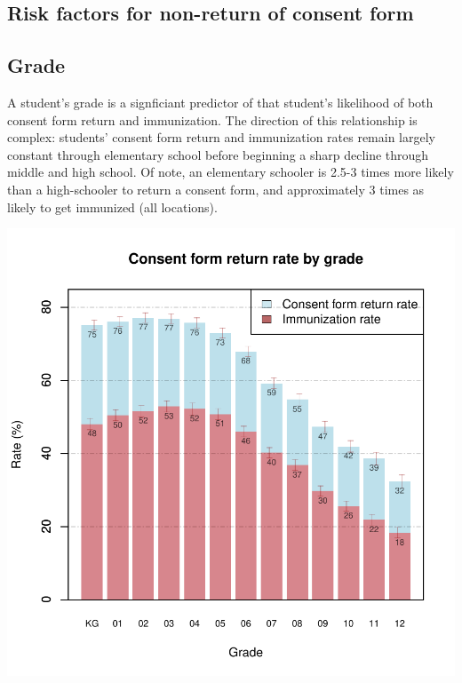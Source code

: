 \documentclass{article}
\begin{document}
\begin{multicols}{2}
\begin{center}
\section*{Risk factors for non-return of consent form}
\end{center}
\begin{multicols}{2}




\subsection*{Grade}

A student's grade is a signficiant predictor of that student's likelihood of both consent form return and immunization.  The direction of this relationship is complex: students' consent form return and immunization rates remain largely constant through elementary school before beginning a sharp decline through middle and high school.  Of note, an elementary schooler is 2.5-3 times more likely than a high-schooler to return a consent form, and approximately 3 times as likely to get immunized (all locations).  

\begin{center}
\includegraphics{superintendent-002}
\end{center}


\end{multicols}
\end{multicols}
\end{document}
